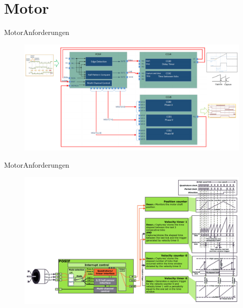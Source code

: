   \author{Andreas Kölbl}
\section{Motor}
	
	\begin{frame}{Motor}{Anforderungen}

		\begin{figure}[htbp]
			\centering
			\includegraphics[width=\textwidth]{Motor/interconnects.png}
		\end{figure}
	\end{frame}
	
\begin{frame}{Motor}{Anforderungen}
	
	\begin{figure}[htbp]
		\centering
		\includegraphics[width=\textwidth]{Motor/quadrature.jpg}
	\end{figure}
\end{frame}
